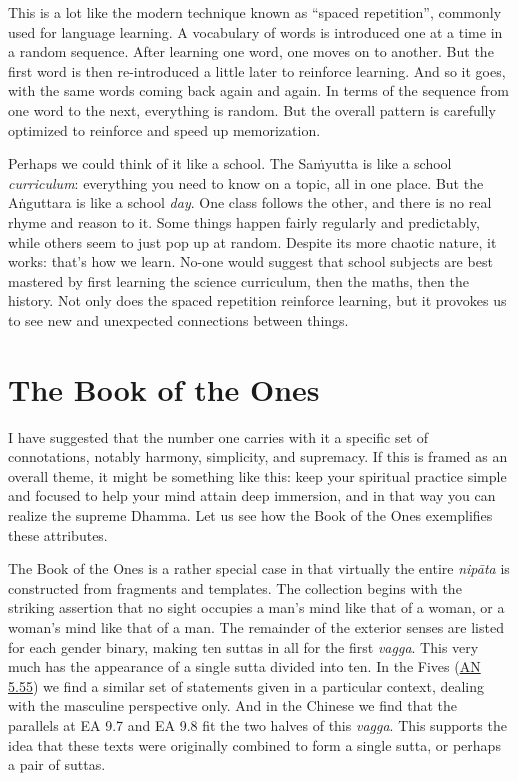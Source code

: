 \documentclass[12pt,openany]{book}%
\begin{document}
This is a lot like the modern technique known as “spaced repetition”, commonly used for language learning. A vocabulary of words is introduced one at a time in a random sequence. After learning one word, one moves on to another. But the first word is then re-introduced a little later to reinforce learning. And so it goes, with the same words coming back again and again. In terms of the sequence from one word to the next, everything is random. But the overall pattern is carefully optimized to reinforce and speed up memorization.

Perhaps we could think of it like a school. The \textsanskrit{Saṁyutta} is like a school \emph{curriculum}: everything you need to know on a topic, all in one place. But the \textsanskrit{Aṅguttara} is like a school \emph{day}. One class follows the other, and there is no real rhyme and reason to it. Some things happen fairly regularly and predictably, while others seem to just pop up at random. Despite its more chaotic nature, it works: that’s how we learn. No-one would suggest that school subjects are best mastered by first learning the science curriculum, then the maths, then the history. Not only does the spaced repetition reinforce learning, but it provokes us to see new and unexpected connections between things.

\section*{The Book of the Ones}

I have suggested that the number one carries with it a specific set of connotations, notably harmony, simplicity, and supremacy. If this is framed as an overall theme, it might be something like this: keep your spiritual practice simple and focused to help your mind attain deep immersion, and in that way you can realize the supreme Dhamma. Let us see how the Book of the Ones exemplifies these attributes.

The Book of the Ones is a rather special case in that virtually the entire \textit{\textsanskrit{nipāta}} is constructed from fragments and templates. The collection begins with the striking assertion that no sight occupies a man’s mind like that of a woman, or a woman’s mind like that of a man. The remainder of the exterior senses are listed for each gender binary, making ten suttas in all for the first \textit{vagga}. This very much has the appearance of a single sutta divided into ten. In the Fives (\href{https://suttacentral.net/an5.55}{AN 5.55}) we find a similar set of statements given in a particular context, dealing with the masculine perspective only. And in the Chinese we find that the parallels at EA 9.7 and EA 9.8 fit the two halves of this \textit{vagga}. This supports the idea that these texts were originally combined to form a single sutta, or perhaps a pair of suttas.
\end{document}
